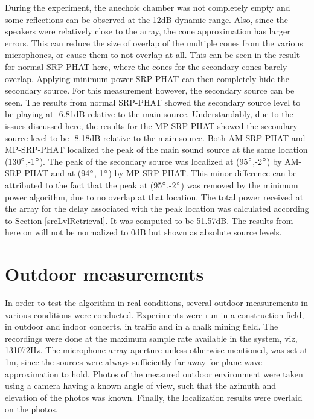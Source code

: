 During the experiment, the anechoic chamber was not completely empty and some reflections can be observed at the 12dB dynamic range. Also, since the speakers were relatively close to the array, the cone approximation has larger errors. This can reduce the size of overlap of the multiple cones from the various microphones, or cause them to not overlap at all. This can be seen in the result for normal SRP-PHAT here, where the cones for the secondary cones barely overlap. Applying minimum power SRP-PHAT can then completely hide the secondary source. For this measurement however, the secondary source can be seen. The results from normal SRP-PHAT showed the secondary source level to be playing at -6.81dB relative to the main source. Understandably, due to the issues discussed here, the results for the MP-SRP-PHAT showed the secondary source level to be -8.18dB relative to the main source. Both AM-SRP-PHAT and MP-SRP-PHAT localized the peak of the main sound source at the same location (130$\degree$,-1$\degree$). The peak of the secondary source was localized at (95$\degree$,-2$\degree$) by  AM-SRP-PHAT and at (94$\degree$,-1$\degree$) by MP-SRP-PHAT. This minor difference can be attributed to the fact that the peak at (95$\degree$,-2$\degree$) was removed by the minimum power algorithm, due to no overlap at that location. The total power received at the array for the delay associated with the peak location was calculated according to Section \ref{srcLvlRetrieval}. It was computed to be 51.57dB. The results from here on will not be normalized to 0dB but shown as absolute source levels. 
\section{Outdoor measurements}
In order to test the algorithm in real conditions, several outdoor measurements in various conditions were conducted. Experiments were run in a construction field, in outdoor and indoor concerts, in traffic and in a chalk mining field. The recordings were done at the maximum sample rate available in the system, viz, 131072Hz. The microphone array aperture unless otherwise mentioned, was set at 1m, since the sources were always sufficiently far away for plane wave approximation to hold. Photos of the measured outdoor environment were taken using a camera having a known angle of view, such that the azimuth and elevation of the photos was known. Finally, the localization results were overlaid on the photos.
